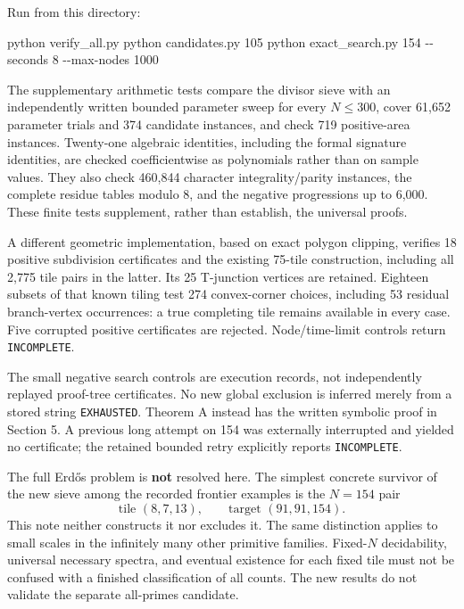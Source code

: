 \documentclass[
  11pt,
]{article}
\newenvironment{Shaded}{}{}
\newcommand{\NormalTok}[1]{#1}
\begin{document}
Run from this directory:

\begin{Shaded}
\begin{Highlighting}[]
\NormalTok{python verify\_all.py}
\NormalTok{python candidates.py 105}
\NormalTok{python exact\_search.py 154 {-}{-}seconds 8 {-}{-}max{-}nodes 1000}
\end{Highlighting}
\end{Shaded}

The supplementary arithmetic tests compare the divisor sieve with an
independently written bounded parameter sweep for every \(N\le300\),
cover 61,652 parameter trials and 374 candidate instances, and check 719
positive-area instances. Twenty-one algebraic identities, including the
formal signature identities, are checked coefficientwise as polynomials
rather than on sample values. They also check 460,844 character
integrality/parity instances, the complete residue tables modulo \(8\),
and the negative progressions up to 6,000. These finite tests
supplement, rather than establish, the universal proofs.

A different geometric implementation, based on exact polygon clipping,
verifies 18 positive subdivision certificates and the existing 75-tile
construction, including all 2,775 tile pairs in the latter. Its 25
T-junction vertices are retained. Eighteen subsets of that known tiling
test 274 convex-corner choices, including 53 residual branch-vertex
occurrences: a true completing tile remains available in every case.
Five corrupted positive certificates are rejected. Node/time-limit
controls return \texttt{INCOMPLETE}.

The small negative search controls are execution records, not
independently replayed proof-tree certificates. No new global exclusion
is inferred merely from a stored string \texttt{EXHAUSTED}. Theorem A
instead has the written symbolic proof in Section 5. A previous long
attempt on 154 was externally interrupted and yielded no certificate;
the retained bounded retry explicitly reports \texttt{INCOMPLETE}.

The full Erdős problem is \textbf{not} resolved here. The simplest
concrete survivor of the new sieve among the recorded frontier examples
is the \(N=154\) pair
\[\text{tile }(8,7,13),\qquad\text{target }(91,91,154).\] This note
neither constructs it nor excludes it. The same distinction applies to
small scales in the infinitely many other primitive families.
Fixed-\(N\) decidability, universal necessary spectra, and eventual
existence for each fixed tile must not be confused with a finished
classification of all counts. The new results do not validate the
separate all-primes candidate.
\end{document}

